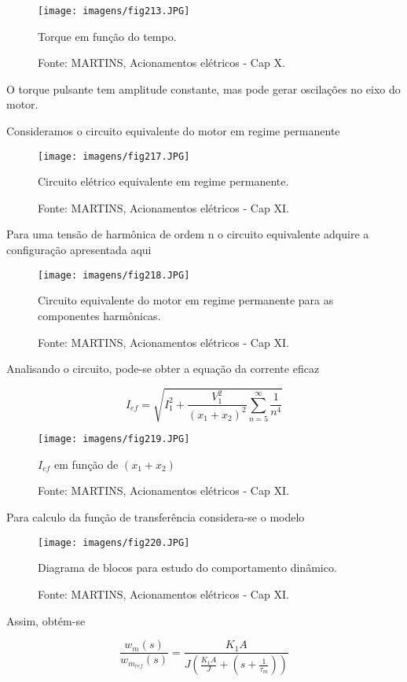 \begin{figure}[ht!]
\center
\texttt{[image: imagens/fig213.JPG]}
\caption{\label{fig:fig213} Torque em função do tempo.}
\caption*{Fonte: MARTINS, Acionamentos elétricos - Cap X.}
\end{figure}

O torque pulsante tem amplitude constante, mas pode gerar oscilações no eixo do motor.

Consideramos o circuito equivalente do motor em regime permanente

\begin{figure}[ht!]
\center
\texttt{[image: imagens/fig217.JPG]}
\caption{\label{fig:fig217} Circuito elétrico equivalente em regime permanente.}
\caption*{Fonte: MARTINS, Acionamentos elétricos - Cap XI.}
\end{figure}

Para uma tensão de harmônica de ordem n o circuito equivalente adquire a configuração apresentada aqui

\begin{figure}[ht!]
\center
\texttt{[image: imagens/fig218.JPG]}
\caption{\label{fig:fig218} Circuito equivalente do motor em regime permanente para as componentes harmônicas.}
\caption*{Fonte: MARTINS, Acionamentos elétricos - Cap XI.}
\end{figure}

Analisando o circuito, pode-se obter a equação da corrente eficaz

\[  I_{ef} = \sqrt{I_1 ^2 + \frac{V_1 ^2}{(x_1+x_2)^2}\sum_{n=5}^{\infty }\frac{1}{n^4}} \]

\begin{figure}[ht!]
\center
\texttt{[image: imagens/fig219.JPG]}
\caption{\label{fig:fig219} $ I_{ef}$ em função de $(x_{1}+x_{2})$}
\caption*{Fonte: MARTINS, Acionamentos elétricos - Cap XI.}
\end{figure}

Para calculo da função de transferência considera-se o modelo

\begin{figure}[ht!]
\center
\texttt{[image: imagens/fig220.JPG]}
\caption{\label{fig:fig220} Diagrama de blocos para estudo do comportamento dinâmico.}
\caption*{Fonte: MARTINS, Acionamentos elétricos - Cap XI.}
\end{figure}

Assim, obtém-se

\[ \frac{w_m(s)}{w_{m_{ref}}(s)} = \frac{K_1A}{J\left ( \frac{K_1A}{J}+\left ( s+ \frac{1}{\tau _m}\right ) \right )}  \]

